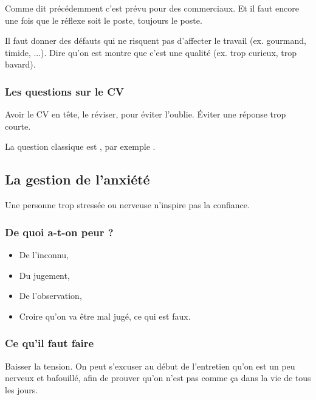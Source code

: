 Comme dit précédemment c'est prévu pour des commerciaux. Et il faut encore une fois que le réflexe soit le poste, toujours le poste.

Il faut donner des défauts qui ne risquent pas d'affecter le travail (ex. gourmand, timide, ...). Dire qu'on est  montre que c'est une qualité (ex. trop curieux, trop bavard).

\subsubsection{Les questions sur le CV}
Avoir le CV en tête, le réviser, pour éviter l'oublie. Éviter une réponse trop courte.

La question classique est , par exemple .

\subsection{La gestion de l'anxiété}
Une personne trop stressée ou nerveuse n'inspire pas la confiance.

\subsubsection{De quoi a-t-on peur ?}
\begin{itemize}
    \item De l'inconnu,
    \item Du jugement,
    \item De l'observation,
    \item Croire qu'on va être mal jugé, ce qui est faux.
\end{itemize}

\subsubsection{Ce qu'il faut faire}
Baisser la tension. On peut s'excuser au début de l'entretien qu'on est un peu nerveux et bafouillé, afin de prouver qu'on n'est pas comme ça dans la vie de tous les jours.
